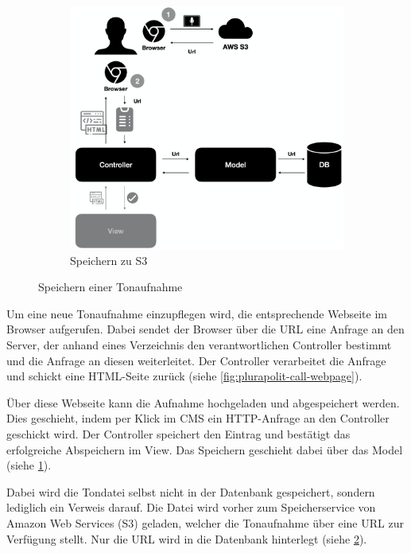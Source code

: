 \begin{figure}
\begin{subfigure}[a]{0.4\linewidth}
		\label{fig:plurapolit-save-sounddatei}
	\end{subfigure}
	\begin{subfigure}[b]{0.4\linewidth}
		\includegraphics[width=\linewidth]{Assets/PluraPolit-Softwaresystem.003}
		\caption{Speichern zu S3}
		\label{fig:plurapolit-save-to-s3}
	\end{subfigure}
	\caption{Speichern einer Tonaufnahme}
	\label{fig:coffee}
\end{figure}

Um eine neue Tonaufnahme einzupflegen wird, die entsprechende Webseite im Browser aufgerufen. Dabei sendet der Browser über die URL eine Anfrage an den Server, der anhand eines Verzeichnis den verantwortlichen Controller bestimmt und die Anfrage an diesen weiterleitet.  Der Controller verarbeitet die Anfrage und schickt eine HTML-Seite zurück (siehe \cref{fig:plurapolit-call-webpage}).

Über diese Webseite kann die Aufnahme hochgeladen und abgespeichert werden. 
Dies geschieht, indem per Klick im CMS ein HTTP-Anfrage an den Controller geschickt wird. Der Controller speichert den Eintrag und bestätigt das erfolgreiche Abspeichern im View. Das Speichern geschieht dabei über das Model (siehe \cref{fig:plurapolit-save-sounddatei}).

Dabei wird die Tondatei selbst nicht in der Datenbank gespeichert, sondern lediglich ein Verweis darauf. 
Die Datei wird vorher zum Speicherservice von Amazon Web Services (S3) geladen, welcher die Tonaufnahme über eine URL zur Verfügung stellt. Nur die URL wird in die Datenbank hinterlegt (siehe \cref{fig:plurapolit-save-to-s3}).

